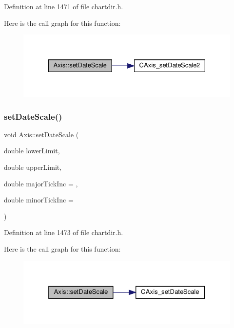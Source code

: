 Definition at line 1471 of file chartdir.\+h.

Here is the call graph for this function\+:
\nopagebreak
\begin{figure}[H]
\begin{center}
\leavevmode
\includegraphics[width=330pt]{class_axis_a8b68b9e92ed809ecadf3aa3e46c77983_cgraph}
\end{center}
\end{figure}
\mbox{\label{class_axis_a38cc17d35a91fee2075c2aa7e57e9da8}} 
\subsubsection{\texorpdfstring{set\+Date\+Scale()}{setDateScale()}\hspace{0.1cm}{\footnotesize\ttfamily [3/3]}}
{\footnotesize\ttfamily void Axis\+::set\+Date\+Scale (\begin{DoxyParamCaption}\item[{double}]{lower\+Limit,  }\item[{double}]{upper\+Limit,  }\item[{double}]{major\+Tick\+Inc = {},  }\item[{double}]{minor\+Tick\+Inc = {} }\end{DoxyParamCaption})\hspace{0.3cm}{\ttfamily [inline]}}



Definition at line 1473 of file chartdir.\+h.

Here is the call graph for this function\+:
\nopagebreak
\begin{figure}[H]
\begin{center}
\leavevmode
\includegraphics[width=325pt]{class_axis_a38cc17d35a91fee2075c2aa7e57e9da8_cgraph}
\end{center}
\end{figure}
\mbox{\label{class_axis_aa73c26b4400fa61689f924fcea85c97e}} 

